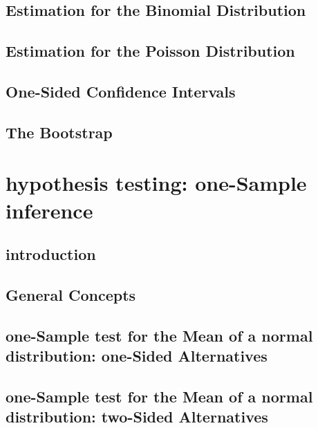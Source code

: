 \documentclass[12pt,]{article}
\theoremstyle{definition}
\theoremstyle{definition}
\theoremstyle{definition}
\theoremstyle{remark}
\begin{document}
\subsection{Estimation for the Binomial
Distribution}\label{estimation-for-the-binomial-distribution}

\subsection{Estimation for the Poisson
Distribution}\label{estimation-for-the-poisson-distribution}

\subsection{One-Sided Confidence
Intervals}\label{one-sided-confidence-intervals}

\subsection{The Bootstrap}\label{the-bootstrap}

\section{hypothesis testing: one-Sample
inference}\label{hypothesis-testing-one-sample-inference}

\subsection{introduction}\label{introduction-4}

\subsection{General Concepts}\label{general-concepts-1}

\subsection{one-Sample test for the Mean of a normal distribution:
one-Sided
Alternatives}\label{one-sample-test-for-the-mean-of-a-normal-distribution-one-sided-alternatives}

\subsection{one-Sample test for the Mean of a normal distribution:
two-Sided
Alternatives}\label{one-sample-test-for-the-mean-of-a-normal-distribution-two-sided-alternatives}
\end{document}
